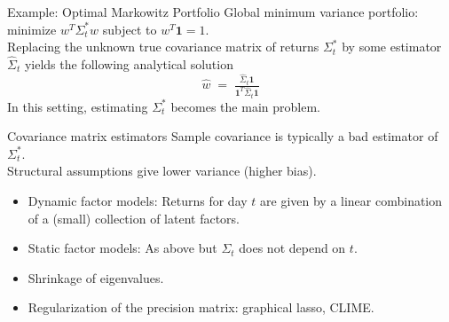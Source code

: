 \documentclass[dvipsnames,aspectratio=169]{beamer} %
\newcommand{\bs}{\boldsymbol}
\begin{document}
%

\begin{frame}{Example: Optimal Markowitz Portfolio}
	Global minimum variance portfolio:\\[.2cm] 
	\hspace{1cm}minimize $w^T\Sigma_t^*w$ subject to $w^T\bs 1=1$.\\[.2cm]
	Replacing the unknown true covariance matrix of returns $\Sigma^*_t$ by some estimator $\hat\Sigma_t$  yields the following analytical solution
	$$
	\hat w\;=\;\tfrac{\hat\Sigma_t\bs 1}{\bs 1^T\hat\Sigma_t\bs 1}
	$$
	In this setting, estimating $\Sigma^*_t$ becomes the main problem.
\end{frame}

\begin{frame}{Covariance matrix estimators}
	Sample covariance is typically a bad estimator of $\Sigma^*_t$.\\[.2cm] 
	Structural assumptions give lower variance (higher bias). 
	\begin{itemize}
		\item Dynamic factor models: Returns for day $t$ are given by a linear combination of a (small) collection of latent factors. \\[.3cm]
		\item Static factor models: As above but $\Sigma_t$ does not depend on $t$. \\[.3cm]
		\item Shrinkage of eigenvalues.\\[.3cm]
		\item Regularization of the precision matrix: graphical lasso, CLIME.
	\end{itemize}
	\end{frame}
	
\end{document}
